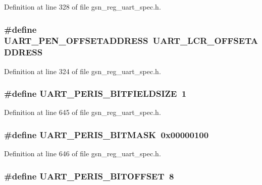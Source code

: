 Definition at line 328 of file gsn\_\-reg\_\-uart\_\-spec.h.

\hypertarget{a00575_aff428022d6befc12bc5a7b6b3221b42d}{
\subsubsection[{UART\_\-PEN\_\-OFFSETADDRESS}]{\setlength{\rightskip}{0pt plus 5cm}\#define UART\_\-PEN\_\-OFFSETADDRESS~UART\_\-LCR\_\-OFFSETADDRESS}}
\label{a00575_aff428022d6befc12bc5a7b6b3221b42d}


Definition at line 324 of file gsn\_\-reg\_\-uart\_\-spec.h.

\hypertarget{a00575_abf49abec0446d6cdddbac40dab7d24dc}{
\subsubsection[{UART\_\-PERIS\_\-BITFIELDSIZE}]{\setlength{\rightskip}{0pt plus 5cm}\#define UART\_\-PERIS\_\-BITFIELDSIZE~1}}
\label{a00575_abf49abec0446d6cdddbac40dab7d24dc}


Definition at line 645 of file gsn\_\-reg\_\-uart\_\-spec.h.

\hypertarget{a00575_ab6b77bcc034b76f5bd5e822d7222a2ab}{
\subsubsection[{UART\_\-PERIS\_\-BITMASK}]{\setlength{\rightskip}{0pt plus 5cm}\#define UART\_\-PERIS\_\-BITMASK~0x00000100}}
\label{a00575_ab6b77bcc034b76f5bd5e822d7222a2ab}


Definition at line 646 of file gsn\_\-reg\_\-uart\_\-spec.h.

\hypertarget{a00575_abd1833b618070788ad47a6be09a2abb4}{
\subsubsection[{UART\_\-PERIS\_\-BITOFFSET}]{\setlength{\rightskip}{0pt plus 5cm}\#define UART\_\-PERIS\_\-BITOFFSET~8}}
\label{a00575_abd1833b618070788ad47a6be09a2abb4}


